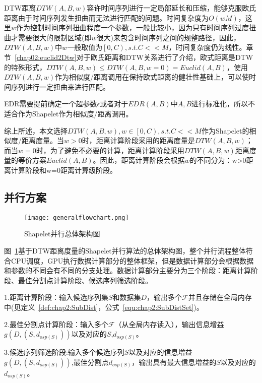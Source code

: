 DTW距离$DTW(A,B,w)$容许时间序列进行一定局部延长和压缩，能够克服欧氏距离由于时间序列发生扭曲而无法进行匹配的问题。时间复杂度为$O(wM)$，这里$w$作为控制时间序列扭曲程度一个参数，一般比较小，因为只有时间序列过度扭曲才需要很大的限制区域(即$w$很大)来包含时间序列之间的规整路径，因此，$DTW(A,B,w)$中$w$一般取值为$\left[ 0,C\right),s.t. C << M $，时间复杂度仍为线性。章节~\ref{chap02:euclid2Dtw}对于欧氏距离和DTW关系进行了介绍，欧式距离是DTW的特殊形式，$DTW(A,B,w)\leq DTW(A,B,w=0) = Euclid(A,B)$，使用$DTW(A,B,w)$作为相似度/距离调用在保持欧式距离的健壮性基础上，可以使时间序列进行一定扭曲来进行匹配。

EDR需要提前确定一个超参数$\epsilon$或者对于$EDR(A,B)$中$A,B$进行标准化，所以不适合作为Shapelet作为相似度/距离调用。

综上所述，本文选择$DTW(A,B,w),w\in \left[0,C\right),s.t. C << M$作为Shapelet的相似度/距离度量。当$w>0$时，距离计算阶段采用的距离度量是$DTW(A,B,w)$；而当$w=0$时，为了避免不必要的计算，距离计算阶段采用$DTW(A,B,w)$距离度量的等价方案$Euclid(A,B)$。因此，距离计算阶段会根据$w$的不同分为：w>0距离计算阶段和w=0距离计算级阶段。

\subsection{并行方案}
\label{cha:chap04:myalg:Overview:overallScheme}

\begin{figure}[H] %
	\centering
	\texttt{[image: generalflowchart.png]}
	\caption{Shapelet并行总体架构图}
	\label{fig:generalflow}
\end{figure}

图~\ref{fig:generalflow}基于DTW距离度量的Shapelet并行算法的总体架构图，整个并行流程整体符合CPU调度，GPU执行数据计算部分的整体框架，但是数据计算部分会根据数据和参数的不同会有不同的分支处理。数据计算部分主要分为三个阶段：距离计算阶段、最佳分割点计算阶段、候选序列筛选阶段。

1.距离计算阶段：输入候选序列集$S$和数据集$D$，输出多个$\mathcal{F}$并且存储在全局内存中(见定义~\ref{def:chap2:SubDist}，公式~\ref{equ:chap2:SubDistSet})。 

2.最佳分割点计算阶段：输入多个$\mathcal{F}$（从全局内存读入），输出信息增益$g(D,(S,d_{osp(S)}))$以及对应的$S$,$d_{osp(S)}$。

3.候选序列筛选阶段:输入多个候选序列$S$以及对应的信息增益$g(D,(S,d_{osp(S)}))$,最佳分割点$d_{osp(S)}$，输出具有最大信息增益的$S$以及对应的$d_{osp(S)}$。

